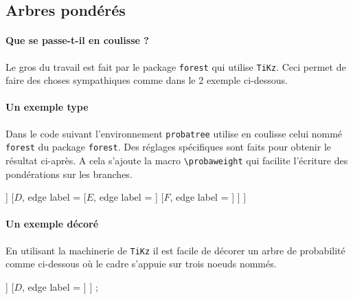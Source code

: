 \documentclass[12pt,a4paper]{article}
\theoremstyle{definition}
\begin{document}

\subsection{Arbres pondérés}

\paragraph{Que se passe-t-il en coulisse ?}

Le gros du travail est fait par le package \verb+forest+ qui utilise \verb+TiKz+. Ceci permet de faire des choses sympathiques comme dans le 2\ieme{} exemple ci-dessous.


\paragraph{Un exemple type}

Dans le code suivant l'environnement \verb+probatree+ utilise en coulisse celui nommé \verb+forest+ du package \verb+forest+. Des réglages spécifiques sont faits pour obtenir le résultat ci-après. A cela s'ajoute la macro \verb+\probaweight+ qui facilite l'écriture des pondérations sur les branches.

\begin{tcblisting}{}
\begin{probatree}
[
    [$A$, edge label = \probaweight{$a$}
        [$B$, edge label = \probaweight{$b$}]
        [$C$, edge label = \probaweight{$c$}]
    ]
    [$D$, edge label = 
        [$E$, edge label = ]
        [$F$, edge label = ]
    ]
]
\end{probatree}

\end{tcblisting}


\paragraph{Un exemple décoré}

En utilisant la machinerie de \verb+TiKz+ il est facile de décorer un arbre de probabilité comme ci-dessous où le cadre s'appuie sur trois noeuds nommés.

\begin{tcblisting}{}
\begin{probatree}
[
    [$A$, name = left, edge label = \probaweight{$a$}
        [$B$, name = topright, edge label = \probaweight{$b$}]
        [$C$, name = bottomright, edge label = \probaweight{$c$}]
    ]
    [$D$, edge label = ]
]
\node[draw = blue, thick, rounded corners, fit = (left)(topright)(bottomright)] {};
\end{probatree}

\end{tcblisting}
\end{document}

